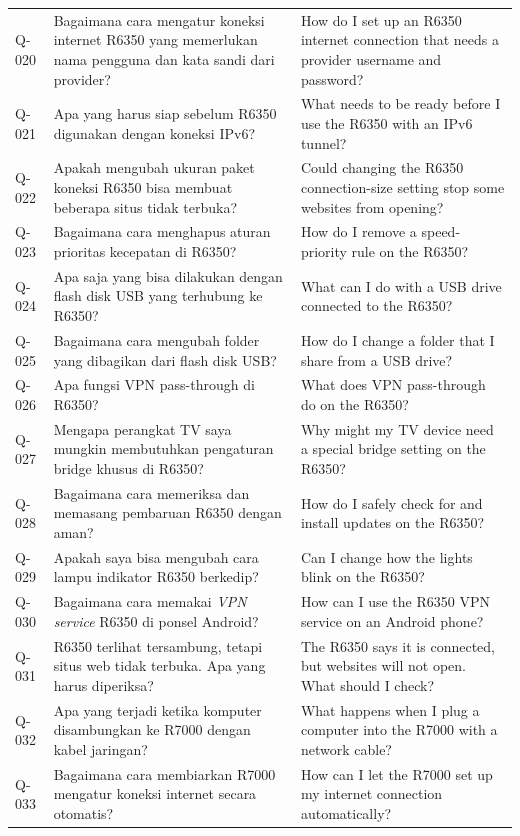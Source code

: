 \begin{longtable}{@{}>{\RaggedRight\arraybackslash}p{1.6cm}>{\RaggedRight\arraybackslash}p{5.8cm}>{\RaggedRight\arraybackslash}p{\dimexpr\textwidth-1.6cm-5.8cm-4\tabcolsep\relax}@{}}
Q-020 & Bagaimana cara mengatur koneksi internet R6350 yang memerlukan nama pengguna dan kata sandi dari provider? & How do I set up an R6350 internet connection that needs a provider username and password? \\
Q-021 & Apa yang harus siap sebelum R6350 digunakan dengan koneksi IPv6? & What needs to be ready before I use the R6350 with an IPv6 tunnel? \\
Q-022 & Apakah mengubah ukuran paket koneksi R6350 bisa membuat beberapa situs tidak terbuka? & Could changing the R6350 connection-size setting stop some websites from opening? \\
Q-023 & Bagaimana cara menghapus aturan prioritas kecepatan di R6350? & How do I remove a speed-priority rule on the R6350? \\
Q-024 & Apa saja yang bisa dilakukan dengan flash disk USB yang terhubung ke R6350? & What can I do with a USB drive connected to the R6350? \\
Q-025 & Bagaimana cara mengubah folder yang dibagikan dari flash disk USB? & How do I change a folder that I share from a USB drive? \\
Q-026 & Apa fungsi VPN pass-through di R6350? & What does VPN pass-through do on the R6350? \\
Q-027 & Mengapa perangkat TV saya mungkin membutuhkan pengaturan bridge khusus di R6350? & Why might my TV device need a special bridge setting on the R6350? \\
Q-028 & Bagaimana cara memeriksa dan memasang pembaruan R6350 dengan aman? & How do I safely check for and install updates on the R6350? \\
Q-029 & Apakah saya bisa mengubah cara lampu indikator R6350 berkedip? & Can I change how the lights blink on the R6350? \\
Q-030 & Bagaimana cara memakai \emph{VPN service} R6350 di ponsel Android? & How can I use the R6350 VPN service on an Android phone? \\
Q-031 & R6350 terlihat tersambung, tetapi situs web tidak terbuka. Apa yang harus diperiksa? & The R6350 says it is connected, but websites will not open. What should I check? \\
Q-032 & Apa yang terjadi ketika komputer disambungkan ke R7000 dengan kabel jaringan? & What happens when I plug a computer into the R7000 with a network cable? \\
Q-033 & Bagaimana cara membiarkan R7000 mengatur koneksi internet secara otomatis? & How can I let the R7000 set up my internet connection automatically? \\

\end{longtable}

